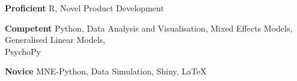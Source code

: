 \textbf{Proficient} \phantom{:} R, Novel Product Development

\textbf{Competent} Python, Data Analysis and Visualisation, Mixed Effects Models, Generalised Linear Models, \\
 PsychoPy

\textbf{Novice}  MNE-Python, Data Simulation, Shiny, LaTeX
